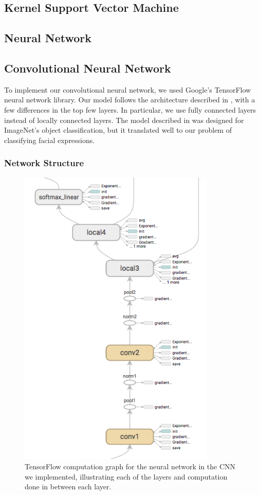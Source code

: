 \documentclass[11pt, twocolumn, twoside]{article}
\begin{document}
\subsection{Kernel Support Vector Machine}

\subsection{Neural Network}

\subsection{Convolutional Neural Network}

To implement our convolutional neural network, we used Google's TensorFlow neural network library.
Our model follows the architecture described in \cite{Krizhevsky}, with a few differences in the top few layers.
In particular, we use fully connected layers instead of locally connected layers. The model described in
\cite{Krizhevsky} was designed for ImageNet's object classification, but it translated well to our problem of classifying facial expressions.

\subsubsection{Network Structure}

\begin{figure}
	\centering
	\includegraphics[width=3.7in]{inference_graph}
	\caption{TensorFlow computation graph for the neural network in the CNN we implemented, illustrating each of the layers and computation done in between each layer.}
	\label{fig:inference}
\end{figure}
\end{document}
